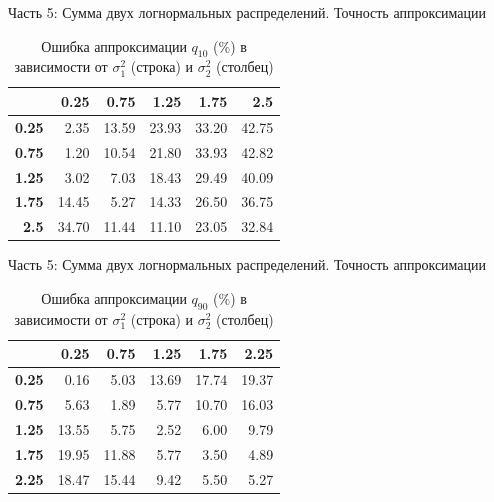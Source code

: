 \documentclass[ucs, notheorems, handout]{beamer}
\begin{document}
	\begin{frame}{Часть 5: Сумма двух логнормальных распределений. Точность аппроксимации}
		\begin{table}[ht]
			\centering
			\caption{Ошибка аппроксимации $q_{10}$ ($\%$) в зависимости от $\sigma_{1}^{2}$ (строка) и $\sigma_{2}^{2}$ (столбец)}
			\begin{tabular}{rrrrrr}
				\hline
				& \textbf{0.25} & \textbf{0.75} & \textbf{1.25} & \textbf{1.75} & \textbf{2.5} \\
				\hline
				\textbf{0.25} & 2.35 & 13.59 & 23.93 & 33.20 & 42.75 \\ 
				\textbf{0.75} & 1.20 & 10.54 & 21.80 & 33.93 & 42.82 \\ 
				\textbf{1.25} & 3.02 & 7.03 & 18.43 & 29.49 & 40.09 \\ 
				\textbf{1.75} & 14.45 & 5.27 & 14.33 & 26.50 & 36.75 \\ 
				\textbf{2.5} & 34.70 & 11.44 & 11.10 & 23.05 & 32.84 \\ 
				\hline
			\end{tabular}
		\end{table}
	
		
	\end{frame}
	
	\begin{frame}{Часть 5: Сумма двух логнормальных распределений. Точность аппроксимации}
		
		\begin{table}[ht]
			\centering
			\caption{Ошибка аппроксимации $q_{90}$ ($\%$) в зависимости от $\sigma_{1}^{2}$ (строка) и $\sigma_{2}^{2}$ (столбец) }
			\begin{tabular}{rrrrrr}
				\hline
				& \textbf{0.25} & \textbf{0.75} & \textbf{1.25} & \textbf{1.75} & \textbf{2.25} \\ 
				\hline
				\textbf{0.25} & 0.16 & 5.03 & 13.69 & 17.74 & 19.37 \\ 
				\textbf{0.75} & 5.63 & 1.89 & 5.77 & 10.70 & 16.03 \\ 
				\textbf{1.25} & 13.55 & 5.75 & 2.52 & 6.00 & 9.79 \\ 
				\textbf{1.75} & 19.95 & 11.88 & 5.77 & 3.50 & 4.89 \\ 
				\textbf{2.25} & 18.47 & 15.44 & 9.42 & 5.50 & 5.27 \\ 
				\hline
			\end{tabular}
		\end{table}
	
		
	\end{frame}
	
\end{document}
